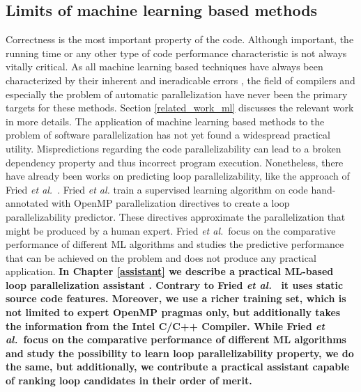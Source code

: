 \subsection{Limits of machine learning based methods}
\label{background_challenges_ml}
\quad Correctness is the most important property of the code. Although important, the running time or any other type of code performance characteristic is not always vitally critical. As all machine learning based techniques have always been characterized by their inherent and ineradicable errors \cite{James:2013:ISL:2517747}, the field of compilers and especially the problem of automatic parallelization have never been the primary targets for these methods. Section \ref{related_work_ml} discusses the relevant work in more details.\newline\null
\quad The application of machine learning based methods to the problem of software parallelization has not yet found a widespread practical utility. Mispredictions regarding the code parallelizability can lead to a broken dependency property and thus incorrect program execution. Nonetheless, there have already been works on predicting loop parallelizability, like the approach of Fried \emph{et al.}~\cite{fried_ea:2013:icmla}. Fried \emph{et al.} train a supervised learning algorithm on code hand-annotated with OpenMP parallelization directives to create a loop parallelizability predictor. These directives approximate the parallelization that might be produced by a human expert. Fried \emph{et al.}~focus on the comparative performance of different ML algorithms and studies the predictive performance that can be achieved on the problem and does not produce any practical application.\newline\null
\textbf{\quad In Chapter \ref{assistant} we describe a practical ML-based loop parallelization assistant \cite{assistant-aiseps}. Contrary to Fried \emph{et al.}~\cite{fried_ea:2013:icmla} it uses static source code features. Moreover, we use a richer training set, which is not limited to expert OpenMP pragmas only, but additionally takes the information from the Intel C/C++ Compiler. While Fried \emph{et al.}~focus on the comparative performance of different ML algorithms and study the possibility to learn loop parallelizability property, we do the same, but
additionally, we contribute a practical assistant capable of ranking loop candidates in their order of merit.}
